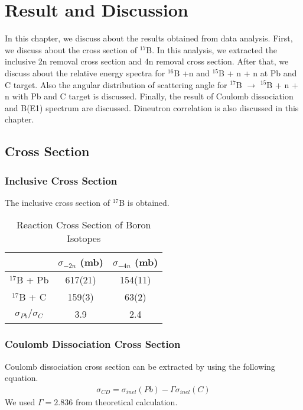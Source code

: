 \chapter{Result and Discussion}
In this chapter, we discuss about the results obtained from data analysis. First, we discuss about the cross section of ${}^{17}$B. In this analysis, we extracted the inclusive 2n removal cross section and 4n removal cross section. After that, we discuss about the relative energy spectra for ${}^{16}$B +n and ${}^{15}$B + n + n at Pb and C target. Also the angular distribution of scattering angle for ${}^{17}$B $\to$ ${}^{15}$B + n + n with Pb and C target is discussed. Finally, the result of Coulomb dissociation and B(E1) spectrum are discussed. Dineutron correlation is also discussed in this chapter.

\section{Cross Section}
\subsection{Inclusive Cross Section}
The inclusive cross section of ${}^{17}$B is obtained. 

\begin{table}[h]
\centering
\begin{tabular}{c|c|c}
    \hline
     & $\sigma_{-2n}$ (mb) & $\sigma_{-4n}$ (mb) \\
    \hline
    $^{17}$B + Pb& 617(21) & 154(11) \\ 
    $^{17}$B + C & 159(3) & 63(2) \\ 
    \hline 
    $\sigma_{Pb}/\sigma_{C}$ & 3.9 & 2.4 \\ 
    \hline
\end{tabular}
\caption{Reaction Cross Section of Boron Isotopes}
\label{tab:Reaction Cross Section of Boron Isotopes}
\end{table}

\subsection{Coulomb Dissociation Cross Section}
Coulomb dissociation cross section can be extracted by using the following equation.
\begin{align}
\sigma_{CD} = \sigma_{inel}(Pb) - \Gamma \sigma_{inel}(C)
\end{align}
We used $\Gamma = 2.836$ from theoretical calculation. \cite{Ogata} 

